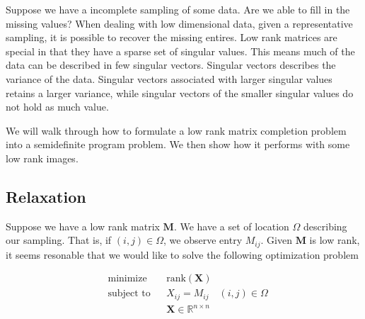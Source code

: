 \documentclass{article}
\begin{document}


Suppose we have a incomplete sampling of some data. Are we able to fill in the missing values? 
When dealing with low dimensional data, given a representative sampling, it is possible to recover the missing entires. 
Low rank matrices are special in that they have a sparse set of singular values. This means much 
of the data can be described in few singular vectors. 
Singular vectors describes the variance of the data. Singular vectors associated with larger singular values
retains a larger variance, while singular vectors of the smaller singular values do not hold as much value. 


We will walk through how to formulate a low rank matrix completion problem into a semidefinite program problem.
We then show how it performs with some low rank images. 

\subsection{Relaxation}

Suppose we have a low rank matrix $\mathbf{M}$. We have a set of location $\Omega$ describing
our sampling. That is, if $(i,j) \in \Omega$, we observe entry $M_{ij}$. Given $\mathbf{M}$ is low rank, 
it seems resonable that we would like to solve the following optimization problem

\begin{equation*}
  \begin{aligned}
  & {\text{minimize}}
  & & \text{rank}(\mathbf{X}) \\[1pt]
  & \text{subject to}
  & & X_{ij} = M_{ij} \quad (i,j) \in \Omega\\[1pt]
  &&& \mathbf{X} \in \mathbb{R}^{n \times n}
  \end{aligned}
\end{equation*}
\end{document}
